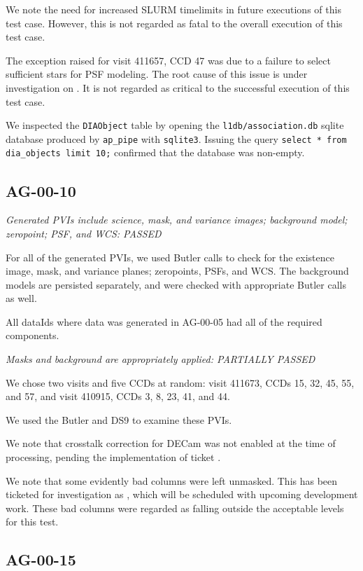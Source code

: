 \documentclass[DM,lsstdraft,STR,toc]{lsstdoc}
\begin{document}
We note the need for increased SLURM timelimits in future executions of this
test case. However, this is not regarded as fatal to the overall execution
of this test case.

The exception raised for visit 411657, CCD 47 was due to a failure to select
sufficient stars for PSF modeling. The root cause of this issue is under
investigation on . It is not regarded as critical to the
successful execution of this test case.

We inspected the \texttt{DIAObject} table by opening the
\texttt{l1db/association.db} sqlite database produced by \texttt{ap\_pipe}
with \texttt{sqlite3}. Issuing the query \texttt{select * from dia\_objects limit 10;} confirmed that the database was non-empty.

\subsection{AG-00-10}
\label{sect:ag-00-10}

\textit{Generated PVIs include science, mask, and variance images; background model; zeropoint; PSF, and WCS: PASSED}

For all of the generated PVIs, we used Butler calls to check for the existence
image, mask, and variance planes; zeropoints, PSFs, and WCS. The background models are persisted separately, and were checked with appropriate Butler calls as well.

All dataIds where data was generated in AG-00-05 had all of the required components.

\textit{Masks and background are appropriately applied: PARTIALLY PASSED}

We chose two visits and five CCDs at random:
visit 411673, CCDs 15, 32, 45, 55, and 57, and
visit 410915, CCDs 3,  8, 23, 41, and 44.

We used the Butler and DS9 to examine these PVIs.

We note that crosstalk correction for DECam was not enabled at the time of
processing, pending the implementation of ticket .

We note that some evidently bad columns were left unmasked. This has been
ticketed for investigation as , which will be scheduled with
upcoming development work. These bad columns were regarded as falling outside
the acceptable levels for this test.

\subsection{AG-00-15}
\label{sect:ag-00-15}
\end{document}
